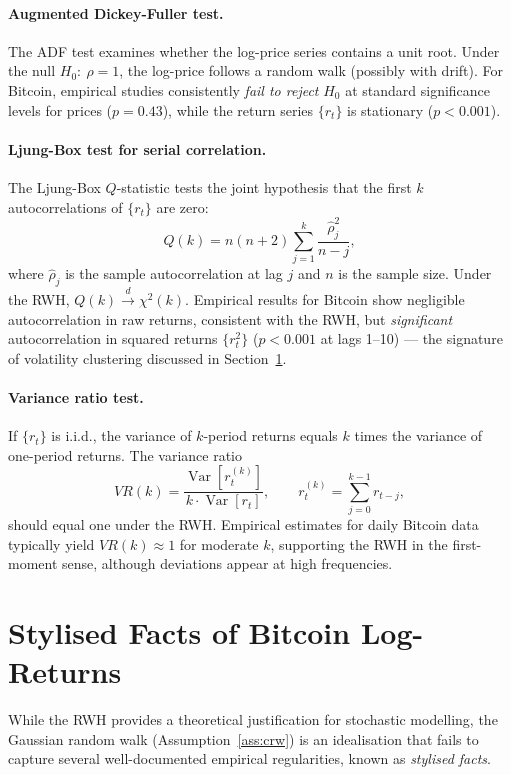 \documentclass[12pt, a4paper, oneside]{report}
\theoremstyle{plain}
\theoremstyle{definition}
\theoremstyle{remark}
\newcommand{\Var}{\operatorname{Var}}
\begin{document}
\paragraph{Augmented Dickey-Fuller test.}
The ADF test examines whether the log-price series contains a unit root.
Under the null $H_0{:}\ \rho = 1$, the log-price follows a random walk (possibly
with drift).  For Bitcoin, empirical studies consistently \emph{fail to reject}
$H_0$ at standard significance levels for prices ($p = 0.43$),
while the return series $\{r_t\}$ is stationary ($p < 0.001$).

\paragraph{Ljung-Box test for serial correlation.}
The Ljung-Box $Q$-statistic tests the joint hypothesis that the first $k$
autocorrelations of $\{r_t\}$ are zero:
\[
  Q(k) = n(n+2)\sum_{j=1}^{k} \frac{\hat{\rho}_j^2}{n - j},
\]
where $\hat{\rho}_j$ is the sample autocorrelation at lag $j$ and $n$ is the
sample size.  Under the RWH, $Q(k) \overset{d}{\to} \chi^2(k)$.
Empirical results for Bitcoin show negligible autocorrelation in raw returns,
consistent with the RWH, but \emph{significant} autocorrelation in squared
returns $\{r_t^2\}$ ($p < 0.001$ at lags 1--10) --- the signature of
volatility clustering discussed in Section~\ref{sec:stylised}.

\paragraph{Variance ratio test.}
If $\{r_t\}$ is i.i.d., the variance of $k$-period returns equals $k$ times the
variance of one-period returns.  The variance ratio
\[
  VR(k) = \frac{\Var[r_t^{(k)}]}{k \cdot \Var[r_t]}, \qquad
  r_t^{(k)} = \sum_{j=0}^{k-1} r_{t-j},
\]
should equal one under the RWH.  Empirical estimates for daily Bitcoin data
typically yield $VR(k) \approx 1$ for moderate $k$, supporting the RWH in the
first-moment sense, although deviations appear at high frequencies.

\section{Stylised Facts of Bitcoin Log-Returns}
\label{sec:stylised}

While the RWH provides a theoretical justification for stochastic modelling,
the Gaussian random walk (Assumption~\ref{ass:crw}) is an idealisation that fails
to capture several well-documented empirical regularities, known as
\emph{stylised facts}.
\end{document}
